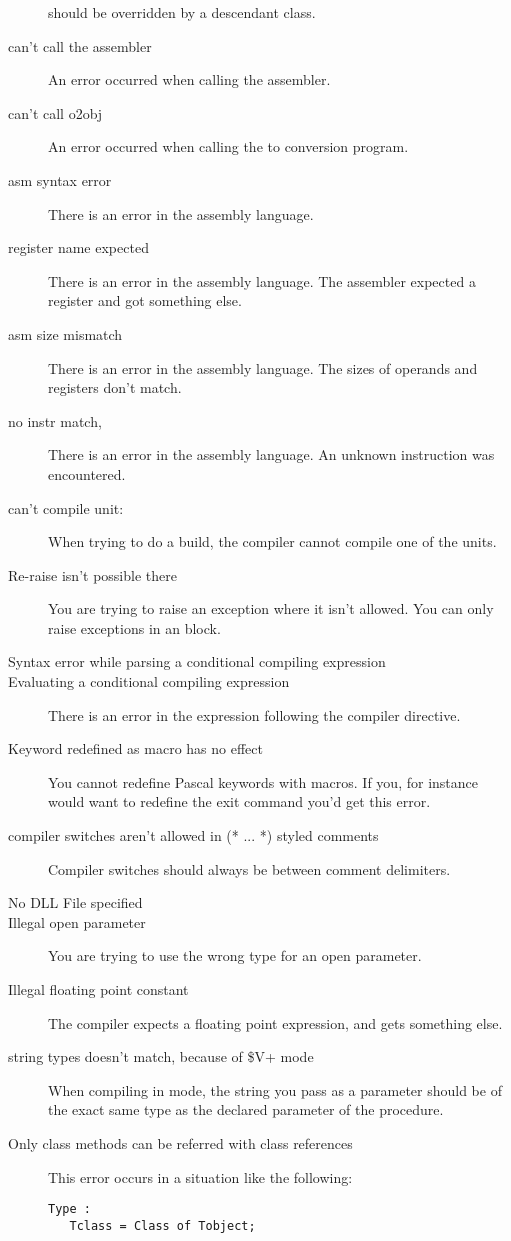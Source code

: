 \documentclass{report}
\begin{document}
\begin{description}
should be overridden by a descendant class.
\item [can't call the assembler]
An error occurred when calling the assembler.
\item [can't call o2obj]
An error occurred when calling the  to  conversion program.
\item [asm syntax error]
There is an error in the assembly language.
\item [register name expected]
There is an error in the assembly language. The assembler expected a
register and got something else.
\item [asm size mismatch]
There is an error in the assembly language. The sizes of operands and
registers don't match.
\item [no instr match,]
There is an error in the assembly language. An unknown instruction was
encountered.
\item [can't compile unit:]
When trying to do a build, the compiler cannot compile one of the units.
\item [Re-raise isn't possible there]
You are trying to raise an exception where it isn't allowed. You can only
raise exceptions in an  block.

\item [ Syntax error while parsing a conditional compiling expression ]
\item [ Evaluating a conditional compiling expression ]
There is an error in the expression following the  compiler
directive.
\item [ Keyword redefined as macro has no effect ]
You cannot redefine Pascal keywords with macros. If you, for instance would
want to redefine the exit command you'd get this error. 
\item [ compiler switches aren't allowed in (* ... *) styled comments ]
Compiler switches should always be between \var{\{ \}} comment delimiters. 
\item [ No DLL File specified ]

\item [ Illegal open parameter ]
You are trying to use the wrong type for an open parameter.
\item [ Illegal floating point constant ]
The compiler expects a floating point expression, and gets something else.
\item [ string types doesn't match, because of \$V+ mode ]
When compiling in  mode, the string you pass as a parameter
should be of the exact same type as the declared parameter of the procedure.
\item [ Only class methods can be referred with class references ]
This error occurs in a situation like the following:
\begin{verbatim}
Type :
   Tclass = Class of Tobject;


\end{verbatim}
\end{description}
\end{document}
